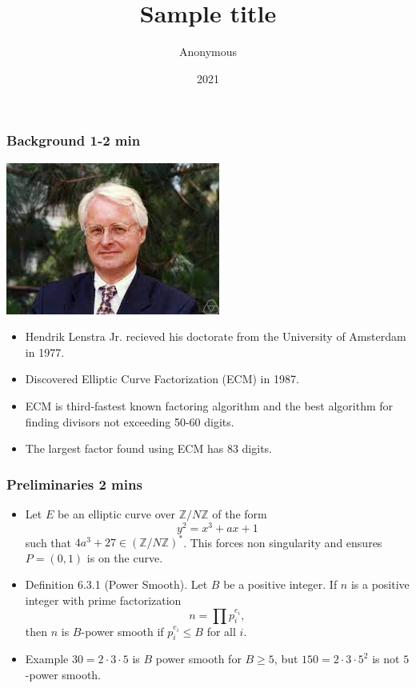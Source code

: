 \documentclass{beamer}
\title{Sample title}
\author{Anonymous}
\institute{Overleaf}
\date{2021}
\begin{document}
\frame{\titlepage}

\begin{frame}
\frametitle{Background 1-2 min}

\includegraphics[scale = .5]{lenstra.jpeg}

\begin{itemize}
\item Hendrik Lenstra Jr. recieved his doctorate from the University of Amsterdam in 1977.

\item Discovered Elliptic Curve Factorization (ECM) in 1987.

\item ECM is third-fastest known factoring algorithm and the best algorithm for finding divisors not exceeding 50-60 digits.

\item The largest factor found using ECM has 83 digits.
\end{itemize}
\end{frame}

\begin{frame}
\frametitle{Preliminaries 2 mins} 
\begin{itemize}
\item Let $E$ be an elliptic curve over $\mathbb{Z}/N\mathbb{Z}$ of the form
$$
	y^2 = x^3 + ax + 1
$$
such that $4a^3 + 27 \in \left(\mathbb{Z}/N\mathbb{Z}\right)^*$. This forces non singularity and ensures $P = (0,1)$ is on the curve.

\item Definition 6.3.1 (Power Smooth). Let $B$ be a positive integer. If $n$ is a positive integer with prime factorization 
$$
    n = \prod p_i^{e_i},
$$
then $n$ is $B$-power smooth if $p_i^{e_i} \leq B$ for all $i$. 

\item Example $30 = 2\cdot 3\cdot 5$ is $B$ power smooth for $B \geq 5$, but $150 = 2\cdot 3 \cdot 5^2$ is not $5$-power smooth.
\end{itemize}
\end{frame}
\end{document}
